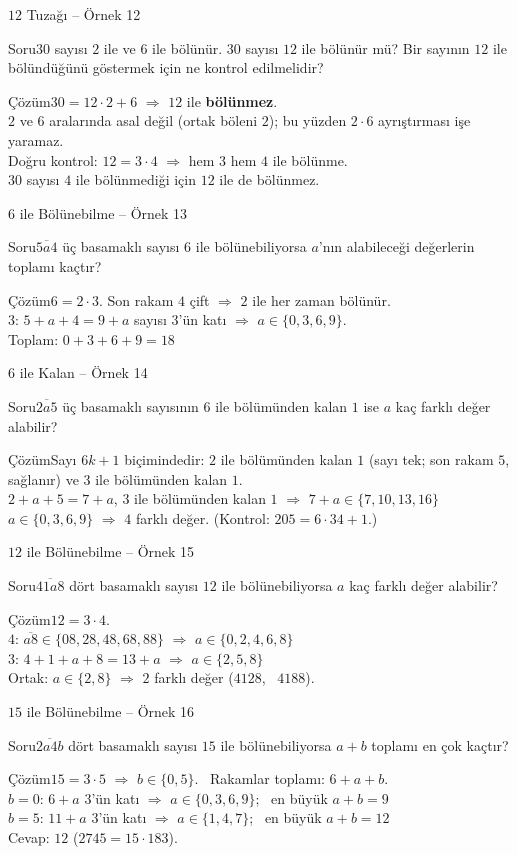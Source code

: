 \documentclass[aspectratio=169,11pt,handout]{beamer}
\newcommand{\soru}[3]{%
\begin{frame}{#1}
  \begin{block}{Soru}\large #2\end{block}
  \pause
  \begin{exampleblock}{Çözüm}\large #3\end{exampleblock}
\end{frame}}
\newcommand{\ab}[1]{\overline{#1}}
\begin{document}
\soru{\(12\) Tuzağı -- Örnek 12}
{\(30\) sayısı \(2\) ile ve \(6\) ile bölünür. \(30\) sayısı \(12\) ile bölünür mü? Bir sayının \(12\) ile bölündüğünü göstermek için ne kontrol edilmelidir?}
{\(30=12\cdot 2+6\) \(\Rightarrow\) \(12\) ile \textbf{bölünmez}.\\[3pt]
\(2\) ve \(6\) aralarında asal değil (ortak böleni \(2\)); bu yüzden \(2\cdot 6\) ayrıştırması işe yaramaz.\\[3pt]
Doğru kontrol: \(12=3\cdot 4\) \(\Rightarrow\) hem \(3\) hem \(4\) ile bölünme.\\
\(30\) sayısı \(4\) ile bölünmediği için \(12\) ile de bölünmez.}

\soru{\(6\) ile Bölünebilme -- Örnek 13}
{\(\ab{5a4}\) üç basamaklı sayısı \(6\) ile bölünebiliyorsa \(a\)'nın alabileceği değerlerin toplamı kaçtır?}
{\(6=2\cdot 3\). Son rakam \(4\) çift \(\Rightarrow\) \(2\) ile her zaman bölünür.\\[3pt]
\(3\): \(5+a+4=9+a\) sayısı \(3\)'ün katı \(\Rightarrow\) \(a\in\{0,3,6,9\}\).\\[3pt]
Toplam: \(0+3+6+9=18\)}

\soru{\(6\) ile Kalan -- Örnek 14}
{\(\ab{2a5}\) üç basamaklı sayısının \(6\) ile bölümünden kalan \(1\) ise \(a\) kaç farklı değer alabilir?}
{Sayı \(6k+1\) biçimindedir: \(2\) ile bölümünden kalan \(1\) (sayı tek; son rakam \(5\), sağlanır) ve \(3\) ile bölümünden kalan \(1\).\\[3pt]
\(2+a+5=7+a\), \(3\) ile bölümünden kalan \(1\) \(\Rightarrow\) \(7+a\in\{7,10,13,16\}\)\\[3pt]
\(a\in\{0,3,6,9\}\) \(\Rightarrow\) \(4\) farklı değer. \quad (Kontrol: \(205=6\cdot 34+1\).)}

\soru{\(12\) ile Bölünebilme -- Örnek 15}
{\(\ab{41a8}\) dört basamaklı sayısı \(12\) ile bölünebiliyorsa \(a\) kaç farklı değer alabilir?}
{\(12=3\cdot 4\).\\[3pt]
\(4\): \(\ab{a8}\in\{08,28,48,68,88\}\) \(\Rightarrow\) \(a\in\{0,2,4,6,8\}\)\\[3pt]
\(3\): \(4+1+a+8=13+a\) \(\Rightarrow\) \(a\in\{2,5,8\}\)\\[3pt]
Ortak: \(a\in\{2,8\}\) \(\Rightarrow\) \(2\) farklı değer \quad (\(4128\), \ \(4188\)).}

\soru{\(15\) ile Bölünebilme -- Örnek 16}
{\(\ab{2a4b}\) dört basamaklı sayısı \(15\) ile bölünebiliyorsa \(a+b\) toplamı en çok kaçtır?}
{\(15=3\cdot 5\) \(\Rightarrow\) \(b\in\{0,5\}\). \ Rakamlar toplamı: \(6+a+b\).\\[3pt]
\(b=0\): \(6+a\) \(3\)'ün katı \(\Rightarrow\) \(a\in\{0,3,6,9\}\); \ en büyük \(a+b=9\)\\[3pt]
\(b=5\): \(11+a\) \(3\)'ün katı \(\Rightarrow\) \(a\in\{1,4,7\}\); \ en büyük \(a+b=12\)\\[3pt]
Cevap: \(12\) \quad (\(2745=15\cdot 183\)).}
\end{document}
